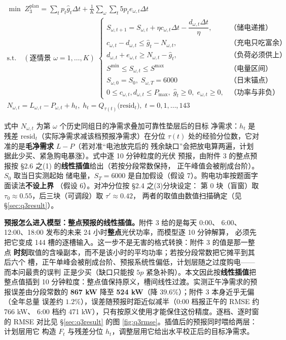 \documentclass[withoutpreface]{cumcmthesis}
\renewcommand{\emph}[1]{\textbf{#1}}
\begin{document}
\begin{equation}
\begin{gathered}
\min\; Z_3^{\text{plan}}=\sum_t p_t\hat g_t\Delta t
  +\frac{1}{K}\sum_\omega\sum_t 5p_t e_{\omega,t}\Delta t\\[2pt]
\text{s.t.}\quad(\text{逐情景 }\omega=1,\dots,K)\;
\begin{cases}
S_{\omega,t+1}=S_{\omega,t}+\eta c_{\omega,t}\Delta t-\dfrac{d_{\omega,t}\Delta t}{\eta},
  & \text{（储电递推）}\\
c_{\omega,t}-d_{\omega,t}\le\hat g_t-N_{\omega,t}, & \text{（充电只吃富余）}\\
d_{\omega,t}+e_{\omega,t}\ge N_{\omega,t}-\hat g_t, & \text{（负荷必须供上）}\\
S^{\min}\le S_{\omega,t}\le S^{\max} & \text{（电量区间）}\\
S_{\omega,0}=S_0,\; S_{\omega,T}=6000 & \text{（日末锚点）}\\
0\le c_{\omega,t},d_{\omega,t}\le P_{\max},\; \hat g_t\ge0,\; e_{\omega,t}\ge0,
  & \text{（功率与非负）}
\end{cases}\\[2pt]
N_{\omega,t}=L_{\omega,t}-P_{\omega,t}+h_t,\; h_t=Q_{\tau(t)}\bigl(\mathrm{resid}_t\bigr),\;
t=0,1,\dots,143
\end{gathered}
\label{eq:q3plan}
\end{equation}

式中 $N_{\omega,t}$ 为第 $\omega$ 个历史同组日的净需求叠加可靠性垫层后的目标
净需求：$h_t$ 是残差 $\mathrm{resid}_t$（实际净需求减该档预报净需求）在分位
$\tau(t)$ 处的经验分位数，它对准的是\emph{毛净需求} $L-P$（若对准“电池放完后的
残余缺口”会把放电算两遍，计划据此少买、紧急购电暴涨）。式中逐 10 分钟粒度的光伏
预报，由附件 3 的整点预报按 \S2.6 之(1) 的\textbf{线性插值}给出（若按分段常数保持，
正午峰值会被削成台阶）。$S_0$ 取当日实测起始
储电量，$S_T=6000$ 是自加假设（假设 7）。购电功率按题面字面读法\textbf{不设上界}
（假设 6）。对冲分位按 \S2.4 之(3)分块设定：
第 0 块（盲窗）取 $\tau_0\approx0.55$，后三块（可调段）取 $\tau'\approx0.42$，
两者的取值由数值扫描确定（见 §\ref{sec:q3result}）。

\noindent\textbf{预报怎么进入模型：整点预报的线性插值。}附件 3 给的是每天 0:00、
6:00、12:00、18:00 发布的未来 24 小时\emph{整点}光伏功率，而模型逐 10 分钟解算，
必须先把它变成 144 槽的逐槽输入。这一步不是无害的格式转换：附件 3 的值是那一整点
\emph{时刻}取值的含噪副本，而不是该小时的平均功率；若按分段常数把它摊平到其后六个
槽，正午单峰会被削成台阶、预报系统性偏低，计划层随之过度购电——而本问最贵的误判
正是少买（缺口只能按 $5p$ 紧急补购）。本文因此按\emph{线性插值}把整点值插到
10 分钟粒度：整点值保持原义，槽间线性过渡。实测正午净需求的预报误差由分段常数的
\textbf{867 kW} 降至 \textbf{524 kW}（降 $39.6\%$）；附件 3 本身近乎无偏（全年总量
误差约 $1.2\%$），误差随预报时距近似减半（0:00 档报正午的 RMSE 约 766 kW、
6:00 档约 471 kW），只有按原义使用才能保住这份精度。逐档、逐时窗的 RMSE 对比见
\S\ref{sec:q3result} 的图 \ref{fig:q3rmse}。插值后的预报同时喂给两层：计划层用它
构造 $F_t$ 与残差分位 $h_t$，调整层用它给出水平校正后的目标净需求。
\end{document}
